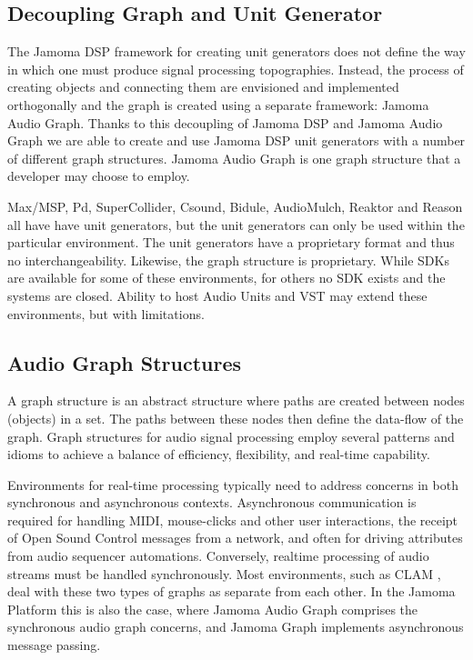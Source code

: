 \documentclass[twoside,a4paper]{article}
\begin{document}

\subsection{Decoupling Graph and Unit Generator} %

The Jamoma DSP framework for creating unit generators does not define the way in which one must produce signal processing topographies.  
Instead, the process of creating objects and connecting them are envisioned and implemented orthogonally and the graph is created using a separate framework: Jamoma Audio Graph.  
Thanks to this decoupling of Jamoma DSP and Jamoma Audio Graph we are able to create and use Jamoma DSP unit generators with a number of different graph structures.  
Jamoma Audio Graph is one graph structure that a developer may choose to employ.

Max/MSP, Pd, SuperCollider, Csound, Bidule, AudioMulch, Reaktor and Reason all have have unit generators, but the unit generators can only be used within the particular environment. 
The unit generators have a proprietary format and thus no interchangeability.  Likewise, the graph structure is proprietary. 
While SDKs are available for some of these environments, for others no SDK exists and the systems are closed. 
Ability to host Audio Units and VST may extend these environments, but with limitations.



\subsection{Audio Graph Structures} %

A graph structure is an abstract structure where paths are created between nodes (objects) in a set.
The paths between these nodes then define the data-flow of the graph.
Graph structures for audio signal processing employ several patterns and idioms to achieve a balance of efficiency, flexibility, and real-time capability.

Environments for real-time processing typically need to address concerns in both synchronous and asynchronous contexts.  
Asynchronous communication is required for handling MIDI, mouse-clicks and other user interactions, the receipt of Open Sound Control messages from a network, and often for driving attributes from audio sequencer automations.
Conversely, realtime processing of audio streams must be handled synchronously.  
Most environments, such as CLAM  \cite{Amatraian:2007}, deal with these two types of graphs as separate from each other.  
In the Jamoma Platform this is also the case, where Jamoma Audio Graph comprises the synchronous audio graph concerns, and Jamoma Graph implements asynchronous message passing.
\end{document}
